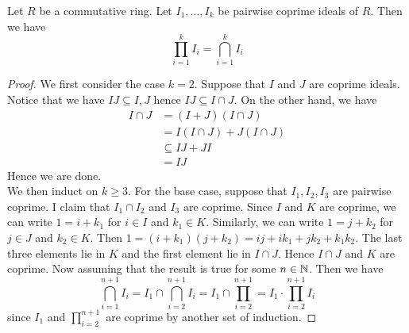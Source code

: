 \documentclass[a4paper]{article}
\begin{document}
\begin{prp}{}{} Let $R$ be a commutative ring. Let $I_1,\dots,I_k$ be pairwise coprime ideals of $R$. Then we have $$\prod_{i=1}^kI_i=\bigcap_{i=1}^kI_i$$ 
\begin{proof}
We first consider the case $k=2$. Suppose that $I$ and $J$ are coprime ideals. Notice that we have $IJ\subseteq I,J$ hence $IJ\subseteq I\cap J$. On the other hand, we have 
\begin{align*}
I\cap J&=(I+J)(I\cap J)\tag{$I,J$ are coprime}\\
&=I(I\cap J)+J(I\cap J)\\
&\subseteq IJ+JI\\
&=IJ
\end{align*}
Hence we are done. \\

We then induct on $k\geq 3$. For the base case, suppose that $I_1,I_2,I_3$ are pairwise coprime. I claim that $I_1\cap I_2$ and $I_3$ are coprime. Since $I$ and $K$ are coprime, we can write $1=i+k_1$ for $i\in I$ and $k_1\in K$. Similarly, we can write $1=j+k_2$ for $j\in J$ and $k_2\in K$. Then $1=(i+k_1)(j+k_2)=ij+ik_1+jk_2+k_1k_2$. The last three elements lie in $K$ and the first element lie in $I\cap J$. Hence $I\cap J$ and $K$ are coprime. Now assuming that the result is true for some $n\in\mathbb{N}$. Then we have $$\bigcap_{i=1}^{n+1}I_i=I_1\cap\bigcap_{i=2}^{n+1}I_i=I_1\cap\prod_{i=2}^{n+1}=I_1\cdot\prod_{i=2}^{n+1}I_i$$ since $I_1$ and $\prod_{i=2}^{n+1}$ are coprime by another set of induction. 
\end{proof}
\end{prp}
\end{document}

